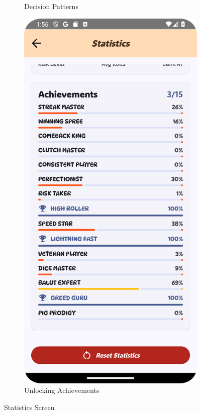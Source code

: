 \begin{figure}[h]
\begin{subfigure}[b]{0.27\textwidth}
        \caption{Decision Patterns}
    \end{subfigure}
    \hfill
    \begin{subfigure}[b]{0.27\textwidth}
        \includegraphics[width=\textwidth]{img/statistics screen2.png}
        \caption{Unlocking Achievements}
    \end{subfigure}
    \caption{Statistics Screen}
    \label{fig:statistics_screen}
\end{figure}

